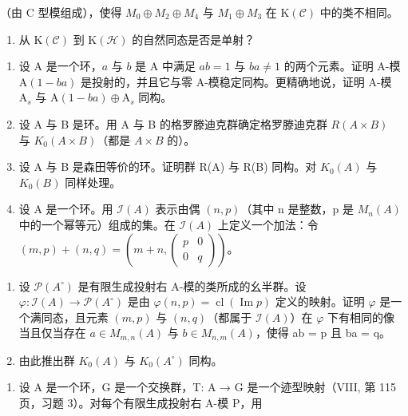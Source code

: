 （由 C 型模组成），使得 \(M_{0} \oplus M_{2} \oplus M_{4}\) 与 \(M_{1} \oplus M_{3}\) 在 \(\mathrm{K}(\mathcal{C})\) 中的类不相同。

\begin{enumerate}
\def\labelenumi{\alph{enumi})}
\setcounter{enumi}{3}
\tightlist
\item
  从 \(\mathrm{K}(\mathcal{C})\) 到 \(\mathrm{K}(\mathcal{H})\) 的自然同态是否是单射？
\end{enumerate}

\begin{enumerate}
\def\labelenumi{\arabic{enumi})}
\setcounter{enumi}{1}
\item
  设 \(\mathrm{A}\) 是一个环，\(a\) 与 \(b\) 是 \(\mathrm{A}\) 中满足 \(ab = 1\) 与 \(ba \neq 1\) 的两个元素。证明 A-模 \(\mathrm{A}(1 - ba)\) 是投射的，并且它与零 A-模稳定同构。更精确地说，证明 A-模 \(\mathrm{A}_s\) 与 \(\mathrm{A}(1 - ba) \oplus \mathrm{A}_s\) 同构。
\item
  设 A 与 B 是环。用 A 与 B 的格罗滕迪克群确定格罗滕迪克群 \(R(A \times B)\) 与 \(K_{0}(A \times B)\)（都是 \(A \times B\) 的）。
\item
  设 A 与 B 是森田等价的环。证明群 R(A) 与 R(B) 同构。对 \(K_{0}(A)\) 与 \(K_{0}(B)\) 同样处理。
\item
  设 A 是一个环。用 \(\mathcal{I}(A)\) 表示由偶 \((n,p)\)（其中 n 是整数，p 是 \(M_{n}(A)\) 中的一个幂等元）组成的集。在 \(\mathcal{I}(A)\) 上定义一个加法：令 \((m,p)+(n,q)=(m+n,\begin{pmatrix} p & 0 \\ 0 & q \end{pmatrix})\)。
\end{enumerate}

\begin{enumerate}
\def\labelenumi{\alph{enumi})}
\item
  设 \(\mathcal{P}(A^{\circ})\) 是有限生成投射右 A-模的类所成的幺半群。设 \(\varphi: \mathcal{I}(A) \to \mathcal{P}(A^{\circ})\) 是由 \(\varphi(n,p) = \operatorname{cl}(\operatorname{Im}p)\) 定义的映射。证明 \(\varphi\) 是一个满同态，且元素 \((m,p)\) 与 \((n,q)\)（都属于 \(\mathcal{I}(A)\)）在 \(\varphi\) 下有相同的像当且仅当存在 \(a \in M_{m,n}(A)\) 与 \(b \in M_{n,m}(A)\)，使得 ab = p 且 ba = q。
\item
  由此推出群 \(K_{0}(A)\) 与 \(K_{0}(A^{\circ})\) 同构。
\end{enumerate}

\begin{enumerate}
\def\labelenumi{\arabic{enumi})}
\setcounter{enumi}{5}
\tightlist
\item
  设 A 是一个环，G 是一个交换群，T: A → G 是一个迹型映射（VIII, 第 115 页，习题 3）。对每个有限生成投射右 A-模 P，用
\end{enumerate}

